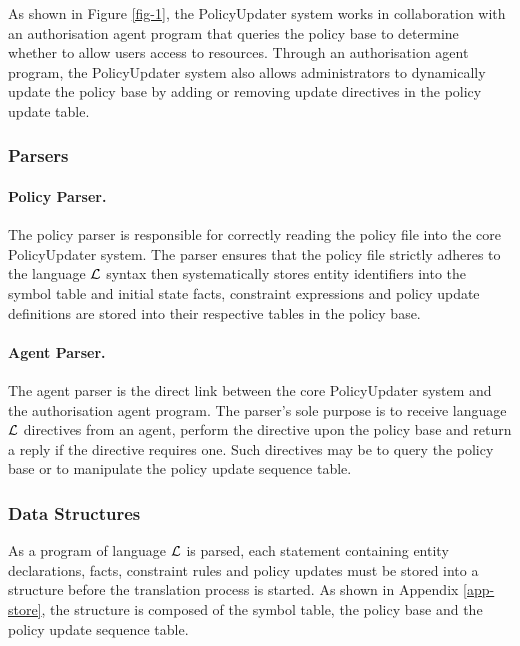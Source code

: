 \documentclass[11pt, twocolumn]{article}
\begin{document}
      As shown in Figure \ref{fig-1}, the PolicyUpdater system works in
      collaboration with an authorisation agent program that queries the
      policy base to determine whether to allow users access to resources.
      Through an authorisation agent program, the PolicyUpdater system also
      allows administrators to dynamically update the policy base by adding
      or removing update directives in the policy update table.

      \subsubsection{Parsers}

        \paragraph{Policy Parser.}

          The policy parser is responsible for correctly reading the policy
          file into the core PolicyUpdater system. The parser ensures that
          the policy file strictly adheres to the language $\cal{L}$ syntax
          then systematically stores entity identifiers into the symbol table
          and initial state facts, constraint expressions and policy update
          definitions are stored into their respective tables in the policy
          base.

        \paragraph{Agent Parser.}

          The agent parser is the direct link between the core PolicyUpdater
          system and the authorisation agent program. The parser's sole purpose
          is to receive language $\cal{L}$ directives from an agent, perform
          the directive upon the policy base and return a reply if the
          directive requires one. Such directives may be to query the policy
          base or to manipulate the policy update sequence table.

      \subsubsection{Data Structures}

        As a program of language ${\cal L}$ is parsed, each statement
        containing entity declarations, facts, constraint rules and policy
        updates must be stored into a structure before the translation process
        is started. As shown in Appendix \ref{app-store}, the structure is composed
        of the symbol table, the policy base and the policy update sequence
        table.
\end{document}
